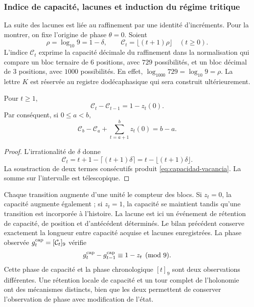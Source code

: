 \subsubsection{Indice de capacité, lacunes et induction du régime tritique}
\label{vac-capacidad-trit}

La suite des lacunes est liée au raffinement par une
identité d'incréments. Pour la montrer, on fixe l'origine de phase
\(\theta=0\). Soient
\[
 \rho=\log_{10}9=1-\delta,\qquad
 \mathcal C_t=\lfloor(t+1)\rho\rfloor\quad(t\geq0).
\]
L'indice \(\mathcal C_t\) exprime la capacité décimale du raffinement
dans la normalisation qui compare un bloc ternaire de \(6\) positions,
avec \(729\) possibilités, et un bloc décimal de \(3\) positions, avec
\(1000\) possibilités. En effet,
\(\log_{1000}729=\log_{10}9=\rho\). La lettre \(K\) est réservée au
registre dodécaphasique qui sera construit ultérieurement.

\begin{proposition}
\label{prop:capacidad-vacancia}
Pour \(t\geq1\),
\begin{equation}
 \mathcal C_t-\mathcal C_{t-1}=1-z_t(0).
 \label{eq:capacidad-vacancia}
\end{equation}
Par conséquent, si \(0\leq a<b\),
\[
 \mathcal C_b-\mathcal C_a+
 \sum_{t=a+1}^{b}z_t(0)=b-a.
\]
\end{proposition}
\begin{proof}
L'irrationalité de \(\delta\) donne
\[
 \mathcal C_t
 =t+1-\lceil(t+1)\delta\rceil
 =t-\lfloor(t+1)\delta\rfloor.
\]
La soustraction de deux termes consécutifs produit
\eqref{eq:capacidad-vacancia}. La somme sur l'intervalle est télescopique.
\end{proof}

Chaque transition augmente d'une unité le compteur des blocs. Si
\(z_t=0\), la capacité augmente également ; si \(z_t=1\), la capacité se
maintient tandis qu'une transition est incorporée à l'histoire. La lacune
est ici un événement de rétention de capacité, de position et
d'antécédent déterminés. Le bilan précédent conserve exactement la
longueur entre capacité acquise et lacunes enregistrées. La phase
observée \(g_t^{\rm cap}=[\mathcal C_t]_9\) vérifie
\[
 g_t^{\rm cap}-g_{t-1}^{\rm cap}\equiv1-z_t\pmod9.
\]
Cette phase de capacité et la phase chronologique \([t]_9\) sont deux
observations différentes. Une rétention locale de capacité et un tour
complet de l'holonomie ont des mécanismes distincts, bien que les deux
permettent de conserver l'observation de phase avec modification de l'état.

